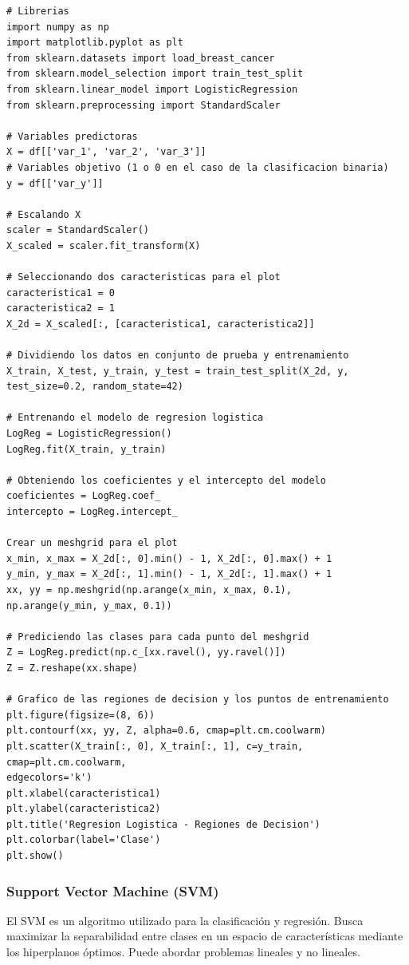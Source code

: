 \documentclass[a4paper, 12pt]{book}
\begin{document}
\begin{verbatim}
# Librerias
import numpy as np
import matplotlib.pyplot as plt
from sklearn.datasets import load_breast_cancer
from sklearn.model_selection import train_test_split
from sklearn.linear_model import LogisticRegression
from sklearn.preprocessing import StandardScaler
	
# Variables predictoras
X = df[['var_1', 'var_2', 'var_3']]
# Variables objetivo (1 o 0 en el caso de la clasificacion binaria)
y = df[['var_y']]

# Escalando X
scaler = StandardScaler()
X_scaled = scaler.fit_transform(X)

# Seleccionando dos caracteristicas para el plot
caracteristica1 = 0
caracteristica2 = 1
X_2d = X_scaled[:, [caracteristica1, caracteristica2]]

# Dividiendo los datos en conjunto de prueba y entrenamiento
X_train, X_test, y_train, y_test = train_test_split(X_2d, y, test_size=0.2, random_state=42)

# Entrenando el modelo de regresion logistica
LogReg = LogisticRegression()
LogReg.fit(X_train, y_train)

# Obteniendo los coeficientes y el intercepto del modelo
coeficientes = LogReg.coef_
intercepto = LogReg.intercept_

Crear un meshgrid para el plot
x_min, x_max = X_2d[:, 0].min() - 1, X_2d[:, 0].max() + 1
y_min, y_max = X_2d[:, 1].min() - 1, X_2d[:, 1].max() + 1
xx, yy = np.meshgrid(np.arange(x_min, x_max, 0.1),
np.arange(y_min, y_max, 0.1))

# Prediciendo las clases para cada punto del meshgrid
Z = LogReg.predict(np.c_[xx.ravel(), yy.ravel()])
Z = Z.reshape(xx.shape)

# Grafico de las regiones de decision y los puntos de entrenamiento
plt.figure(figsize=(8, 6))
plt.contourf(xx, yy, Z, alpha=0.6, cmap=plt.cm.coolwarm)
plt.scatter(X_train[:, 0], X_train[:, 1], c=y_train, cmap=plt.cm.coolwarm,
edgecolors='k')
plt.xlabel(caracteristica1)
plt.ylabel(caracteristica2)
plt.title('Regresion Logistica - Regiones de Decision')
plt.colorbar(label='Clase')
plt.show()
\end{verbatim}

\subsubsection{Support Vector Machine (SVM)}
El SVM es un algoritmo utilizado para la clasificación y regresión. Busca maximizar la separabilidad entre clases en un espacio de características mediante los hiperplanos óptimos. Puede abordar problemas lineales y no lineales.
\end{document}
